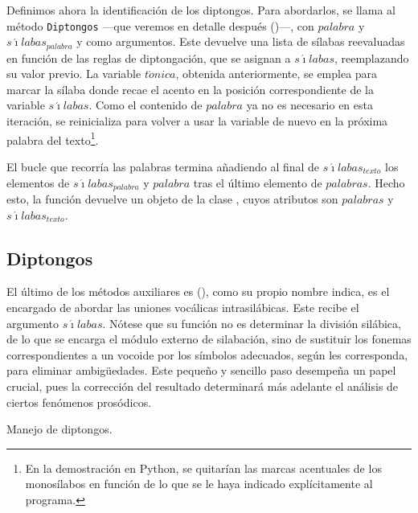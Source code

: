 Definimos ahora la identificación de los diptongos. Para abordarlos, se llama al método \texttt{Diptongos} —que veremos en detalle después ()—, con $palabra$ y $s\acute{\imath}labas_{palabra}$ y  como argumentos. Este devuelve una lista de sílabas reevaluadas en función de las reglas de diptongación, que se asignan a $s\acute{\imath}labas$, reemplazando su valor previo. La variable $t\acute{o}nica$, obtenida anteriormente, se emplea para marcar la sílaba donde recae el acento en la posición correspondiente de la variable $s\acute{\imath}labas$. Como el contenido de $palabra$ ya no es necesario en esta iteración, se reinicializa para volver a usar la variable de nuevo en la próxima palabra del texto\footnote{En la demostración en Python, se quitarían las marcas acentuales de los monosílabos en función de lo que se le haya indicado explícitamente al programa.}.

El bucle que recorría las palabras termina añadiendo al final de $s\acute{\imath}labas_{texto}$ los elementos de  $s\acute{\imath}labas_{palabra}$ y $palabra$ tras el último elemento de  $palabras$.  Hecho esto, la función devuelve un objeto de la clase \Valoresp, cuyos atributos son $palabras$ y  $s\acute{\imath}labas_{texto}$.

\subsection{Diptongos}

El último de los métodos auxiliares es \diptonga{} (), como su propio nombre indica, es el encargado de abordar las uniones vocálicas intrasilábicas. Este recibe el argumento $s\acute{\imath}labas$. Nótese que su función no es determinar la división silábica, de lo que se encarga el módulo externo de silabación, sino de sustituir los fonemas correspondientes a un vocoide por los símbolos adecuados, según les corresponda, para eliminar ambigüedades. Este pequeño y sencillo paso desempeña un papel crucial, pues la corrección del resultado determinará más adelante el análisis de ciertos fenómenos prosódicos.

\begin{algorithm}[!ht] %
	\caption{Manejo de diptongos.}\label{list:diphthongs}
\end{algorithm}

